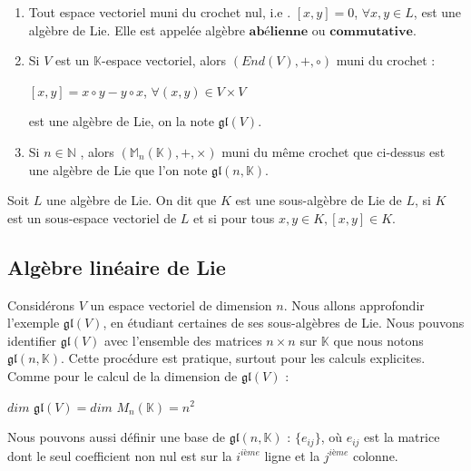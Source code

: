 \documentclass[a4paper,openany,12pt]{report}
\newcommand{\KK}{\mathbb{K}}
\newcommand{\NN}{\mathbb{N}}
\newcommand{\MM}{\mathbb{M}}
\newcommand{\gl}{\mathfrak{gl}}
\theoremstyle{break}
{\theorembodyfont{\upshape}
\newtheorem*{rmq}{Remarque :}
\newtheorem*{prv}{Preuve :}
\newtheorem*{ex}{Exemples :}
\newtheorem*{exe}{Exemple : }
\newtheorem*{nota}{Notation :}
\newtheorem*{dem}{D\'emonstration :}}
\begin{document}
\begin{ex}
\begin{enumerate}
\item Tout espace vectoriel muni du crochet nul, i.e . $[x,y]=0$, $\forall x,y \in L $, est une algèbre de Lie. Elle est appelée algèbre $\textbf{abélienne} $ ou $\textbf{commutative}$.

\item Si $V$ est un $\KK$-espace vectoriel,  alors $(End(V),+,\circ)$ muni du crochet : 
\begin{center}
$[x,y]=x \circ y-y \circ x$, $\forall (x,y) \in V \times V$
\end{center}
est une algèbre de Lie, on la note $\gl(V)$.

\item Si $ n \in \NN $ , alors $(\MM_{n}(\KK),+,\times)$ muni du même crochet que ci-dessus est une algèbre de Lie que l'on note $\gl(n,\KK)$.
\end{enumerate}
\end{ex}

\begin{df} 
\quad Soit $L$ une algèbre de Lie. On dit que $K$ est une sous-algèbre de Lie de $L$, si $K$ est un sous-espace vectoriel de $L$ et si pour tous $x , y \in K , [x,y] \in K$.
\end{df}

\subsection{Algèbre linéaire de Lie}

\quad Considérons $V$ un espace vectoriel de dimension $n$. Nous allons approfondir l'exemple $\gl(V)$, en étudiant certaines de ses sous-algèbres de Lie. Nous pouvons identifier $\gl(V)$  avec l'ensemble des matrices $n \times n$ sur $\KK$ que nous notons $\gl(n,\KK)$. Cette procédure est pratique, surtout pour les calculs explicites. Comme pour le calcul de la dimension de $\gl(V)$ :
\begin{center}
$dim$ $\gl(V)= dim$ $M_{n}(\KK) = n^{2}$
\end{center}
\quad Nous pouvons aussi définir une base de $\gl(n,\KK)$ : $ \{ e_{ij} \}$, où $e_{ij}$ est la matrice dont le seul coefficient non nul est sur la $i^{ième}$ ligne et la $j^{ième}$ colonne.
 
\end{document}
